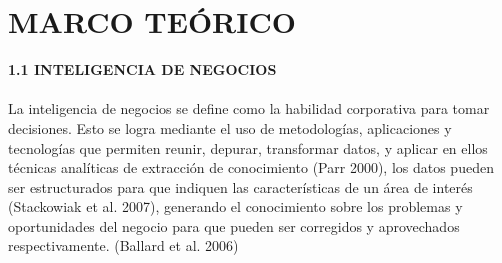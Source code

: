 \section{MARCO TEÓRICO} 
\begin{flushleft}
\textbf {1.1 INTELIGENCIA DE NEGOCIOS}\\
\textbf{}\\
La inteligencia de negocios se define como la habilidad corporativa para tomar decisiones. Esto se logra mediante el uso de metodologías, aplicaciones y tecnologías que permiten reunir, depurar, transformar datos, y aplicar en ellos técnicas analíticas de extracción de conocimiento (Parr 2000), los datos pueden ser estructurados para que indiquen las características de un área de interés (Stackowiak et al. 2007), generando el conocimiento sobre los problemas y oportunidades del negocio para que pueden ser corregidos y aprovechados respectivamente. (Ballard et al. 2006) 


\end{flushleft}
